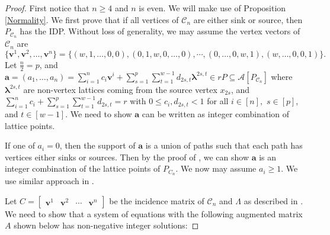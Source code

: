 \documentclass [12pt,a4paper,reqno]{amsart}
\theoremstyle{plain}
\theoremstyle{definition}
\newtheorem{Assumptions and Discussion}[Theorem]{Assumptions and Discussion}
\theoremstyle{remark}
\newcommand\bfv{\mathbf{v}}
\newcommand\bflam{\boldsymbol{\lambda}}
\newcommand\calA{\mathcal{A}}
\newcommand\calC{\mathcal{C}}
\begin{document}
\begin{proof}
First notice that $n\geq 4$ and $n$ is even. We will make use of Proposition \ref{Normality}.  
We first prove that if all vertices of $\calC_n$ are either sink or source, then $P_{\calC_n}$ has the IDP. 
Without loss of generality, we may assume the vertex vectors of $\calC_{n}$ are 
\[
    \{\mathbf{v}^{1},\mathbf{v}^{2},\dots,\mathbf{v}^{n}\}=\{(w,1,\dots,0,0),(0,1,w,0,\dots,0),\cdots,(0,\dots,0,w,1),(w,\dots,0,0,1)\}.
\]
Let $\frac{n}{2}=p$, and  $\mathbf{a}=(a_1,\ldots,a_n) =\sum_{i=1}^{n}c_{i}\mathbf{v}^{i} +\sum_{s=1}^{p}\sum_{t=1}^{w-1}d_{2s,t}\bflam^{2s,t} \in rP \subseteq \calA[P_{\calC_n}]$ where $\bflam^{2s,t}$ are non-vertex lattices coming from the source vertex $x_{2s}$, and $\sum_{i=1}^{n}c_{i} +\sum_{s=1}^{p}\sum_{t=1}^{w-1}d_{2s,t}=r$ with $0\leq c_i, d_{2s,t}<1$ for all $i\in[n],$ $s\in[p]$, and $t\in[w-1]$. We need to show $\mathbf{a}$ can be written as integer combination of lattice points. 


If one of $a_i=0$, then the support of $\mathbf{a}$ is a union of paths such that each path has vertices either sinks or sources. Then by the proof of , we can show $\mathbf{a}$ is an integer combination of the lattice points of $P_{C_n}$. We now may assume $a_i\geq 1$. We use similar approach in . 

Let $C=\begin{bmatrix} \bfv^1& \bfv^2 & \cdots & \bfv^n\end{bmatrix}$ be the incidence matrix of $\calC_n$ and $\Lambda$ as described in . We need to show that a system of equations with the following augmented matrix $A$ shown below has non-negative integer solutions: 


\end{proof}
\end{document}
